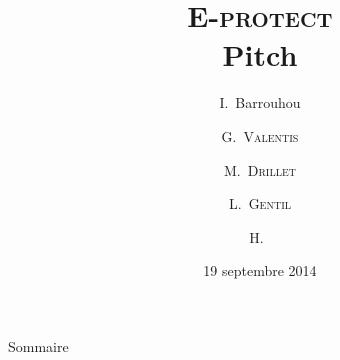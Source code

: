\documentclass[french]{beamer}
\title{\textsc{E-protect}\\ Pitch}
\author{I.~Barrouhou\inst{1} \and G.~\textsc{Valentis}\inst{1} \and M.~\textsc{Drillet}\inst{2} \and L.~\textsc{Gentil}\inst{2} \and H.~\textsc{}\inst{3}}
\institute[ECE Paris] %
{
	ECE Paris École d'Ingénieurs\\
	\inst{1}
	Systèmes Embarqués\\
	\inst{2}
	Systèmes d'Informations\\
	\inst{3}
	Energie et Environnement\\}
\date{19 septembre 2014}
\begin{document}
\begin{frame}
  \titlepage
\end{frame}

\begin{frame}{Sommaire}{~}
  \tableofcontents
\end{frame}

% 
\end{document}
